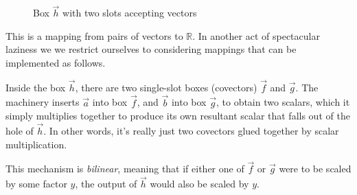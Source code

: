 \begin{figure}[h]
    \centering
    \caption{Box $\vec{h}$ with two slots accepting vectors} \label{fig:2-slot-box}
\end{figure}

This is a mapping from pairs of vectors to $\mathbb{R}$. In another act of spectacular laziness we we restrict ourselves to considering mappings that can be implemented as follows.

Inside the box $\vec{h}$, there are two single-slot boxes (covectors) $\vec{f}$ and $\vec{g}$. The machinery inserts $\vec{a}$ into box $\vec{f}$, and $\vec{b}$ into box $\vec{g}$, to obtain two scalars, which it simply multiplies together to produce its own resultant scalar that falls out of the hole of $\vec{h}$. In other words, it's really just two covectors glued together by scalar multiplication.

This mechanism is \textit{bilinear}, meaning that if either one of $\vec{f}$ or $\vec{g}$ were to be scaled by some factor $y$, the output of $\vec{h}$ would also be scaled by $y$.

